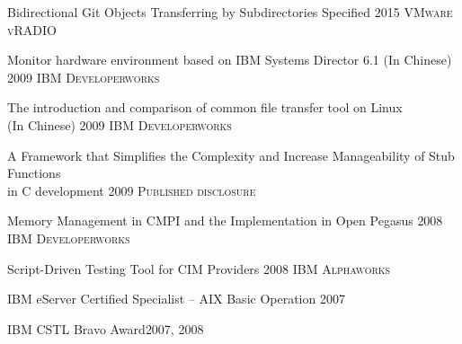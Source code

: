 \documentclass[10pt,letterpaper]{article}
\begin{document}

\spacedhrule{1.6em}{-0.4em} %



\headedsubsection
{Bidirectional Git Objects Transferring by Subdirectories Specified}
{2015 \textsc{VMware vRADIO}}
{}

\headedsubsection
{Monitor hardware environment based on IBM Systems Director 6.1 (In Chinese)}
{2009 \textsc{IBM Developerworks}}
{}

\headedsubsection
{The introduction and comparison of common file transfer tool on Linux\\
    (In Chinese)}
{2009 \textsc{IBM Developerworks}}
{}

\headedsubsection
{A Framework that Simplifies the Complexity and Increase Manageability
of Stub Functions \\
in C development}
{2009 \textsc{Published disclosure}}
{}

\headedsubsection
{Memory Management in CMPI and the Implementation in Open Pegasus}
{2008 \textsc{IBM Developerworks}}
{}

\headedsubsection
{Script-Driven Testing Tool for CIM Providers}
{2008 \textsc{IBM Alphaworks}}
{}

\headedsubsection
{IBM eServer Certified Specialist -- AIX Basic Operation} {2007}{}

\headedsubsection
{IBM CSTL Bravo Award}{2007, 2008}{}
\end{document}
